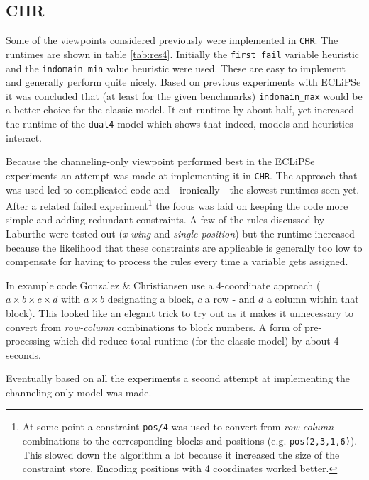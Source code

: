 \subsection{CHR}

Some of the viewpoints considered previously were implemented in \texttt{CHR}. The runtimes are shown in table \ref{tab:res4}. Initially the \texttt{first\_fail} variable heuristic and the \texttt{indomain\_min} value heuristic were used. These are easy to implement and generally perform quite nicely. Based on previous experiments with ECLiPSe it was concluded that (at least for the given benchmarks) \texttt{indomain\_max} would be a better choice for the classic model. It cut runtime by about half, yet increased the runtime of the \texttt{dual4} model which shows that indeed, models and heuristics interact.\\\par 

Because the channeling-only viewpoint performed best in the ECLiPSe experiments an attempt was made at implementing it in \texttt{CHR}. The approach that was used led to complicated code and - ironically - the slowest runtimes seen yet. After a related failed experiment\footnote{At some point a constraint \texttt{pos/4} was used to convert from \textit{row-column} combinations to the corresponding blocks and positions (e.g. \texttt{pos(2,3,1,6)}). This slowed down the algorithm a lot because it increased the size of the constraint store. Encoding positions with 4 coordinates worked better.} the focus was laid on keeping the code more simple and adding redundant constraints. A few of the rules discussed by Laburthe \cite{article:laburthe} were tested out (\textit{x-wing} and \textit{single-position}) but the runtime increased because the likelihood that these constraints are applicable is generally too low to compensate for having to process the rules every time a variable gets assigned.\par
In example code Gonzalez \& Christiansen use a 4-coordinate approach ($a\times b\times c\times d$ with $a\times b$ designating a block, $c$ a row - and $d$ a column within that block). This looked like an elegant trick to try out as it makes it unnecessary to convert from \textit{row-column} combinations to block numbers. A form of pre-processing which did reduce total runtime (for the classic model) by about 4 seconds. \\\par

Eventually based on all the experiments a second attempt at implementing the channeling-only model was made.\\\par 

